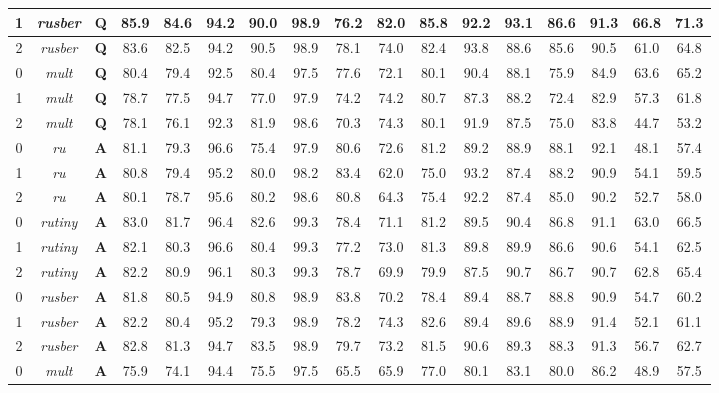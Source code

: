 \begin{table}[t]
{\begin{tabular}{|c|c||c|c|c|c|c|c|c|c|c|c|c|c|c|c|c|}
1 & \textit{rusber} &  \textbf{Q} & 85.9 & 84.6 & 94.2 & 90.0 & 98.9 & 76.2 & 82.0 & 85.8 & 92.2 & 93.1 & 86.6 & 91.3 & 66.8 & 71.3\\ \hline
2 & \textit{rusber} &  \textbf{Q} & 83.6 & 82.5 & 94.2 & 90.5 & 98.9 & 78.1 & 74.0 & 82.4 & 93.8 & 88.6 & 85.6 & 90.5 & 61.0 & 64.8\\ \hline
0 & \textit{mult} &  \textbf{Q} & 80.4 & 79.4 & 92.5 & 80.4 & 97.5 & 77.6 & 72.1 & 80.1 & 90.4 & 88.1 & 75.9 & 84.9 & 63.6 & 65.2\\ \hline
1 & \textit{mult} &  \textbf{Q} & 78.7 & 77.5 & 94.7 & 77.0 & 97.9 & 74.2 & 74.2 & 80.7 & 87.3 & 88.2 & 72.4 & 82.9 & 57.3 & 61.8\\ \hline
2 & \textit{mult} &  \textbf{Q} & 78.1 & 76.1 & 92.3 & 81.9 & 98.6 & 70.3 & 74.3 & 80.1 & 91.9 & 87.5 & 75.0 & 83.8 & 44.7 & 53.2\\ \hline
0 & \textit{ru} &  \textbf{A} & 81.1 & 79.3 & 96.6 & 75.4 & 97.9 & 80.6 & 72.6 & 81.2 & 89.2 & 88.9 & 88.1 & 92.1 & 48.1 & 57.4\\ \hline
1 & \textit{ru} &  \textbf{A} & 80.8 & 79.4 & 95.2 & 80.0 & 98.2 & 83.4 & 62.0 & 75.0 & 93.2 & 87.4 & 88.2 & 90.9 & 54.1 & 59.5\\ \hline
2 & \textit{ru} &  \textbf{A} & 80.1 & 78.7 & 95.6 & 80.2 & 98.6 & 80.8 & 64.3 & 75.4 & 92.2 & 87.4 & 85.0 & 90.2 & 52.7 & 58.0\\ \hline
0 & \textit{rutiny} &  \textbf{A} & 83.0 & 81.7 & 96.4 & 82.6 & 99.3 & 78.4 & 71.1 & 81.2 & 89.5 & 90.4 & 86.8 & 91.1 & 63.0 & 66.5\\ \hline
1 & \textit{rutiny} &  \textbf{A} & 82.1 & 80.3 & 96.6 & 80.4 & 99.3 & 77.2 & 73.0 & 81.3 & 89.8 & 89.9 & 86.6 & 90.6 & 54.1 & 62.5\\ \hline
2 & \textit{rutiny} &  \textbf{A} & 82.2 & 80.9 & 96.1 & 80.3 & 99.3 & 78.7 & 69.9 & 79.9 & 87.5 & 90.7 & 86.7 & 90.7 & 62.8 & 65.4\\ \hline
0 & \textit{rusber} &  \textbf{A} & 81.8 & 80.5 & 94.9 & 80.8 & 98.9 & 83.8 & 70.2 & 78.4 & 89.4 & 88.7 & 88.8 & 90.9 & 54.7 & 60.2\\ \hline
1 & \textit{rusber} &  \textbf{A} & 82.2 & 80.4 & 95.2 & 79.3 & 98.9 & 78.2 & 74.3 & 82.6 & 89.4 & 89.6 & 88.9 & 91.4 & 52.1 & 61.1\\ \hline
2 & \textit{rusber} &  \textbf{A} & 82.8 & 81.3 & 94.7 & 83.5 & 98.9 & 79.7 & 73.2 & 81.5 & 90.6 & 89.3 & 88.3 & 91.3 & 56.7 & 62.7\\ \hline
0 & \textit{mult} &  \textbf{A} & 75.9 & 74.1 & 94.4 & 75.5 & 97.5 & 65.5 & 65.9 & 77.0 & 80.1 & 83.1 & 80.0 & 86.2 & 48.9 & 57.5\\ \hline

\end{tabular}}
\end{table}
